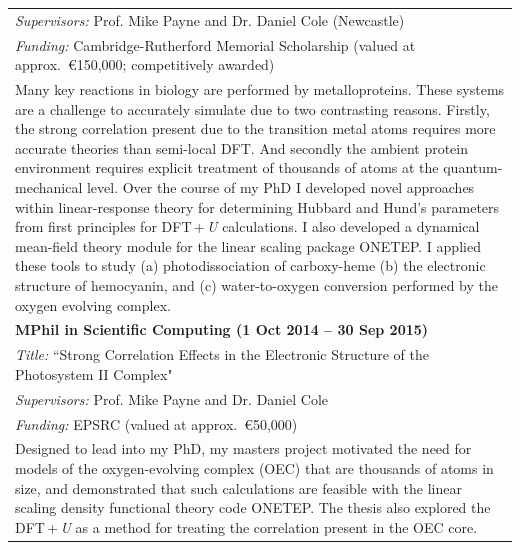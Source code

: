 \documentclass[10pt,a4paper,final]{article}
\begin{document}
\begin{tabularx}{\textwidth}{X}
   \cellcolor{seaborn_bg_grey}%
   \textit{Supervisors:} Prof. Mike Payne and Dr. Daniel Cole (Newcastle)
   \\
   \cellcolor{seaborn_bg_grey}%
   \textit{Funding:} Cambridge-Rutherford Memorial Scholarship (valued at approx.\ \euro{}150,000; competitively awarded)
   \\
   \cellcolor{seaborn_bg_grey}%
   Many key reactions in biology are performed by metalloproteins. These systems are a challenge to accurately simulate due to two contrasting reasons. Firstly, the strong correlation present due to the transition metal atoms requires more accurate theories than semi-local DFT. And secondly the ambient protein environment requires explicit treatment of thousands of atoms at the quantum-mechanical level. Over the course of my PhD I developed novel approaches within linear-response theory for determining Hubbard and Hund's parameters from first principles for DFT\,+\,\emph{U} calculations. I also developed a dynamical mean-field theory module for the linear scaling package ONETEP. I applied these tools to study (a) photodissociation of carboxy-heme (b) the electronic structure of hemocyanin, and (c) water-to-oxygen conversion performed by the oxygen evolving complex.
   \\
   \rowcolor{seaborn_bg_grey}
   \textbf{MPhil in Scientific Computing (1 Oct 2014 -- 30 Sep 2015)}
   \\%
   \rowcolor{seaborn_bg_grey}

   \textit{Title:} ``Strong Correlation Effects in the Electronic Structure of the Photosystem II Complex"
   \\
   \rowcolor{seaborn_bg_grey}%

   \textit{Supervisors:} Prof. Mike Payne and Dr. Daniel Cole
   \\
   \rowcolor{seaborn_bg_grey}%

   \textit{Funding:} EPSRC (valued at approx.\ \euro{}50,000)
   \\
   \rowcolor{seaborn_bg_grey}

   Designed to lead into my PhD, my masters project motivated the need for models of the oxygen-evolving complex (OEC) that are thousands of atoms in size, and demonstrated that such calculations are feasible with the linear scaling density functional theory code ONETEP. The thesis also explored the DFT\,+\,\emph{U} as a method for treating the correlation present in the OEC core.
   \\
\end{tabularx}
\end{document}
